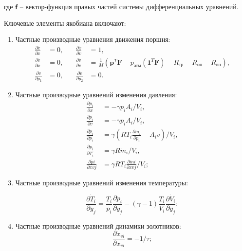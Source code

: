 где $\mathbf{f}$ -- вектор-функция правых частей системы дифференциальных уравнений.

Ключевые элементы якобиана включают:
\begin{enumerate}
    \item Частные производные уравнения движения поршня:
          \begin{equation*}
              \begin{alignedat}{2}
                  \frac{\partial \dot{x}}{\partial x}   & = 0, & \quad \frac{\partial \dot{x}}{\partial v}   & = 1,                     \\
                  \frac{\partial \dot{v}}{\partial x}   & = 0, & \quad \frac{\partial \dot{v}}{\partial v}   & =
                  \frac{1}{M}(\mathbf{p}^T\mathbf{F} - p_\text{атм}(\mathbf{1}^T\mathbf{F}) - R_\text{тр} - R_\text{оп} - R_\text{вн}), \\
                  \frac{\partial \dot{v}}{\partial p_1} & = 0, & \quad \frac{\partial \dot{v}}{\partial p_2} & = 0.
              \end{alignedat}
          \end{equation*}

    \item Частные производные уравнений изменения давления:
          \begin{equation*}
              \begin{alignedat}{2}
                  \frac{\partial \dot{p}_i}{\partial x}    & = -\gamma p_i A_i / V_i,                                                           \\
                  \frac{\partial \dot{p}_i}{\partial v}    & = -\gamma p_i A_i / V_i,                                                           \\
                  \frac{\partial \dot{p}_i}{\partial p_i}  & = \gamma \left(R T_i \frac{\partial \dot{m}_i}{\partial p_i} - A_i v\right) / V_i, \\
                  \frac{\partial \dot{p}_i}{\partial T_i}  & = \gamma R \dot{m}_i / V_i,                                                        \\
                  \frac{\partial \dot{p}i}{\partial x{vj}} & = \gamma R T_i \frac{\partial \dot{m}i}{\partial x{vj}} / V_i;
              \end{alignedat}
          \end{equation*}

    \item Частные производные уравнений изменения температуры:

          \begin{equation*}
              \frac{\partial \dot{T}_i}{\partial y_j} = \frac{T_i}{p_i}\frac{\partial \dot{p}_i}{\partial y_j}
              - (\gamma - 1)\frac{T_i}{V_i}\frac{\partial \dot{V}_i}{\partial y_j};
          \end{equation*}
    \item Частные производные уравнений динамики золотников:
          \begin{equation*}
              \frac{\partial \dot{x}_{vi}}{\partial x_{vi}} = -1/\tau;
          \end{equation*}
\end{enumerate}

